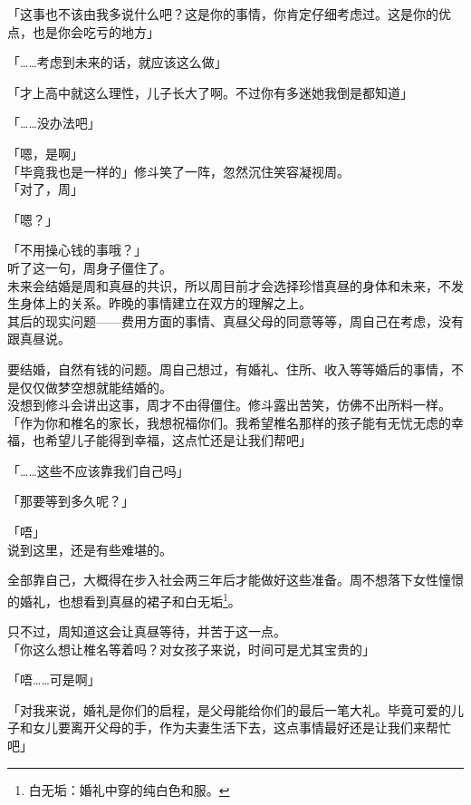 「这事也不该由我多说什么吧？这是你的事情，你肯定仔细考虑过。这是你的优点，也是你会吃亏的地方」

「……考虑到未来的话，就应该这么做」

「才上高中就这么理性，儿子长大了啊。不过你有多迷她我倒是都知道」

「……没办法吧」

「嗯，是啊」\\

「毕竟我也是一样的」修斗笑了一阵，忽然沉住笑容凝视周。\\

「对了，周」

「嗯？」

「不用操心钱的事哦？」\\

听了这一句，周身子僵住了。\\

未来会结婚是周和真昼的共识，所以周目前才会选择珍惜真昼的身体和未来，不发生身体上的关系。昨晚的事情建立在双方的理解之上。\\

其后的现实问题——费用方面的事情、真昼父母的同意等等，周自己在考虑，没有跟真昼说。

要结婚，自然有钱的问题。周自己想过，有婚礼、住所、收入等等婚后的事情，不是仅仅做梦空想就能结婚的。\\

没想到修斗会讲出这事，周才不由得僵住。修斗露出苦笑，仿佛不出所料一样。\\

「作为你和椎名的家长，我想祝福你们。我希望椎名那样的孩子能有无忧无虑的幸福，也希望儿子能得到幸福，这点忙还是让我们帮吧」

「……这些不应该靠我们自己吗」

「那要等到多久呢？」

「唔」\\

说到这里，还是有些难堪的。

全部靠自己，大概得在步入社会两三年后才能做好这些准备。周不想落下女性憧憬的婚礼，也想看到真昼的裙子和白无垢\footnote{白无垢：婚礼中穿的纯白色和服。}。

只不过，周知道这会让真昼等待，并苦于这一点。\\

「你这么想让椎名等着吗？对女孩子来说，时间可是尤其宝贵的」

「唔……可是啊」

「对我来说，婚礼是你们的启程，是父母能给你们的最后一笔大礼。毕竟可爱的儿子和女儿要离开父母的手，作为夫妻生活下去，这点事情最好还是让我们来帮忙吧」\\

